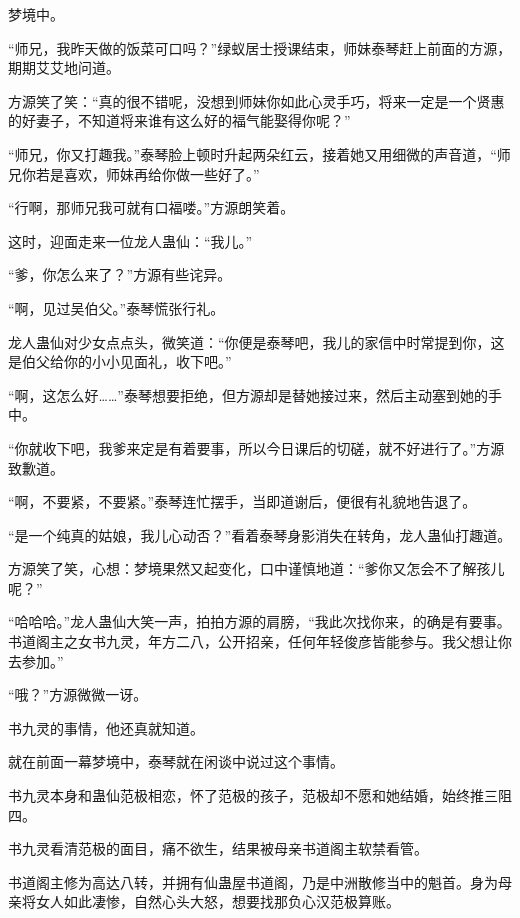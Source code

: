 
\begin{this_body}



梦境中。

“师兄，我昨天做的饭菜可口吗？”绿蚁居士授课结束，师妹泰琴赶上前面的方源，期期艾艾地问道。

方源笑了笑：“真的很不错呢，没想到师妹你如此心灵手巧，将来一定是一个贤惠的好妻子，不知道将来谁有这么好的福气能娶得你呢？”

“师兄，你又打趣我。”泰琴脸上顿时升起两朵红云，接着她又用细微的声音道，“师兄你若是喜欢，师妹再给你做一些好了。”

“行啊，那师兄我可就有口福喽。”方源朗笑着。

这时，迎面走来一位龙人蛊仙：“我儿。”

“爹，你怎么来了？”方源有些诧异。

“啊，见过吴伯父。”泰琴慌张行礼。

龙人蛊仙对少女点点头，微笑道：“你便是泰琴吧，我儿的家信中时常提到你，这是伯父给你的小小见面礼，收下吧。”

“啊，这怎么好……”泰琴想要拒绝，但方源却是替她接过来，然后主动塞到她的手中。

“你就收下吧，我爹来定是有着要事，所以今日课后的切磋，就不好进行了。”方源致歉道。

“啊，不要紧，不要紧。”泰琴连忙摆手，当即道谢后，便很有礼貌地告退了。

“是一个纯真的姑娘，我儿心动否？”看着泰琴身影消失在转角，龙人蛊仙打趣道。

方源笑了笑，心想：梦境果然又起变化，口中谨慎地道：“爹你又怎会不了解孩儿呢？”

“哈哈哈。”龙人蛊仙大笑一声，拍拍方源的肩膀，“我此次找你来，的确是有要事。书道阁主之女书九灵，年方二八，公开招亲，任何年轻俊彦皆能参与。我父想让你去参加。”

“哦？”方源微微一讶。

书九灵的事情，他还真就知道。

就在前面一幕梦境中，泰琴就在闲谈中说过这个事情。

书九灵本身和蛊仙范极相恋，怀了范极的孩子，范极却不愿和她结婚，始终推三阻四。

书九灵看清范极的面目，痛不欲生，结果被母亲书道阁主软禁看管。

书道阁主修为高达八转，并拥有仙蛊屋书道阁，乃是中洲散修当中的魁首。身为母亲将女人如此凄惨，自然心头大怒，想要找那负心汉范极算账。


\end{this_body}
